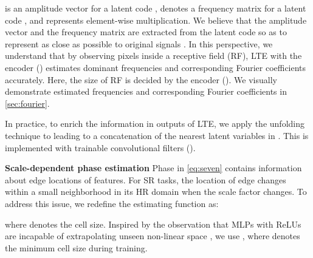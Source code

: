 \documentclass[10pt,twocolumn,letterpaper]{article}
\begin{document}
 is an amplitude vector for a latent code ,  denotes a frequency matrix for a latent code , and  represents element-wise multiplication. We believe that the amplitude vector and the frequency matrix are extracted from the latent code  so as to represent  as close as possible to original signals . In this perspective, we understand that by observing pixels inside a receptive field (RF), LTE with the encoder () estimates dominant frequencies and corresponding Fourier coefficients accurately. Here, the size of RF is decided by the encoder (). We visually demonstrate estimated frequencies and corresponding Fourier coefficients in \cref{sec:fourier}.



In practice, to enrich the information in outputs of LTE, we apply the unfolding technique to  leading to a concatenation of the  nearest latent variables in  \cite{chen2021learning}. This is implemented with trainable convolutional filters (). 













{\bf Scale-dependent phase estimation} Phase in \cref{eq:seven} contains information about edge locations of features. For SR tasks, the location of edge changes within a small neighborhood in its HR domain when the scale factor changes. To address this issue, we redefine the estimating function as:

where  denotes the cell size. Inspired by the observation that MLPs with ReLUs are incapable of extrapolating unseen non-linear space \cite{DBLP:conf/iclr/XuZLDKJ21}, we use , where  denotes the minimum cell size during training.
\end{document}
